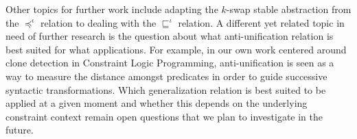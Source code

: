 Other topics for further work include adapting the $k$-swap stable abstraction from the $\preceq^\iota$ relation to dealing with the $\sqsubseteq^\iota$ relation. 
A different yet related topic in need of further research is the question about what anti-unification relation is best suited for what applications. For example, in our own work centered around clone detection in Constraint Logic Programming, anti-unification is seen as a way to measure the distance amongst predicates in order to guide successive syntactic transformations. Which generalization relation is best suited to be applied at a given moment and whether this depends on the underlying constraint context remain open questions that we plan to investigate in the future. 








